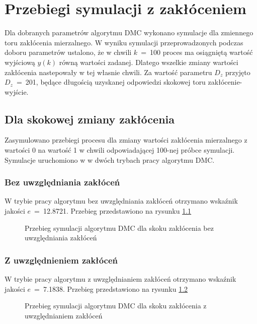 \chapter{Przebiegi symulacji z zakłóceniem}

Dla dobranych parametrów algorytmu DMC wykonano symulacje dla zmiennego toru zakłócenia mierzalnego. W wyniku symulacji przeprowadzonych podczas doboru parametrów ustalono, że w chwili $k$~=~100 proces ma osiągniętą wartość wyjściową $y(k)$ równą wartości zadanej. Dlatego wszelkie zmiany wartości zakłócenia nastepowały w tej własnie chwili. Za wartość parametru $D_z$ przyjęto $D_z$~=~\num{201}, będące długością uzyskanej odpowiedzi skokowej toru zakłócenie-wyjście.


\section{Dla skokowej zmiany zakłócenia}

Zasymulowano przebiegi procesu dla zmiany wartości zakłócenia mierzalnego z wartości 0 na wartość 1 w chwili odpowiadającej 100-nej próbce symulacji. Symulacje uruchomiono w w dwóch trybach pracy algorytmu DMC.

\subsection{Bez uwzględniania zakłóceń}

W trybie pracy algorytmu bez uwzględniania zakłóceń otrzymano wskaźnik jakości $e$~=~\num{12.8721}. Przebieg przedstawiono na rysunku \ref{5przebieg}

\begin{figure}
	
	\centering
	\caption{ Przebieg symulacji algorytmu DMC dla skoku zakłócenia bez uwzględniania zakłóceń }
	
	\label{5przebieg}
\end{figure}

\subsection{Z uwzględnieniem zakłóceń}

W trybie pracy algorytmu z uwzględnianiem zakłóceń otrzymano wskaźnik jakości $e$~=~\num{7.1838}. Przebieg przedstawiono na rysunku \ref{5zprzebieg}

\begin{figure}
	
	\centering
	\caption{ Przebieg symulacji algorytmu DMC dla skoku zakłócenia z uwzględnianiem zakłóceń }
	
	\label{5zprzebieg}
\end{figure}

